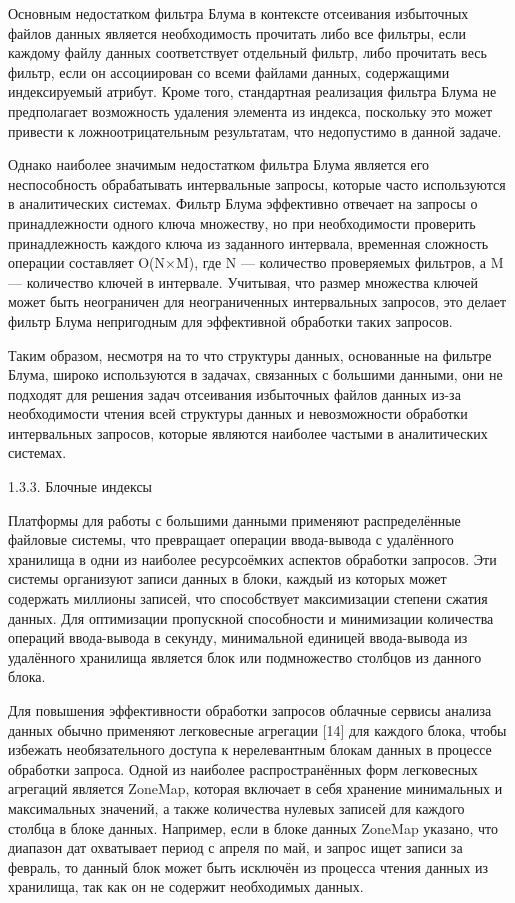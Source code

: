 Основным недостатком фильтра Блума в контексте отсеивания избыточных файлов данных является необходимость прочитать либо все фильтры, если каждому файлу данных соответствует отдельный фильтр, либо прочитать весь фильтр, если он ассоциирован со всеми файлами данных, содержащими индексируемый атрибут. Кроме того, стандартная реализация фильтра Блума не предполагает возможность удаления элемента из индекса, поскольку это может привести к ложноотрицательным результатам, что недопустимо в данной задаче.

Однако наиболее значимым недостатком фильтра Блума является его неспособность обрабатывать интервальные запросы, которые часто используются в аналитических системах. Фильтр Блума эффективно отвечает на запросы о принадлежности одного ключа множеству, но при необходимости проверить принадлежность каждого ключа из заданного интервала, временная сложность операции составляет O(N×M), где N — количество проверяемых фильтров, а M — количество ключей в интервале. Учитывая, что размер множества ключей может быть неограничен для неограниченных интервальных запросов, это делает фильтр Блума непригодным для эффективной обработки таких запросов.

Таким образом, несмотря на то что структуры данных, основанные на фильтре Блума, широко используются в задачах, связанных с большими данными, они не подходят для решения задач отсеивания избыточных файлов данных из-за необходимости чтения всей структуры данных и невозможности обработки интервальных запросов, которые являются наиболее частыми в аналитических системах.

1.3.3. Блочные индексы

Платформы для работы с большими данными применяют распределённые файловые системы, что превращает операции ввода-вывода с удалённого хранилища в одни из наиболее ресурсоёмких аспектов обработки запросов. Эти системы организуют записи данных в блоки, каждый из которых может содержать миллионы записей, что способствует максимизации степени сжатия данных. Для оптимизации пропускной способности и минимизации количества операций ввода-вывода в секунду, минимальной единицей ввода-вывода из удалённого хранилища является блок или подмножество столбцов из данного блока.

Для повышения эффективности обработки запросов облачные сервисы анализа данных обычно применяют легковесные агрегации [14] для каждого блока, чтобы избежать необязательного доступа к нерелевантным блокам данных в процессе обработки запроса. Одной из наиболее распространённых форм легковесных агрегаций является ZoneMap, которая включает в себя хранение минимальных и максимальных значений, а также количества нулевых записей для каждого столбца в блоке данных. Например, если в блоке данных ZoneMap указано, что диапазон дат охватывает период с апреля по май, и запрос ищет записи за февраль, то данный блок может быть исключён из процесса чтения данных из хранилища, так как он не содержит необходимых данных.

